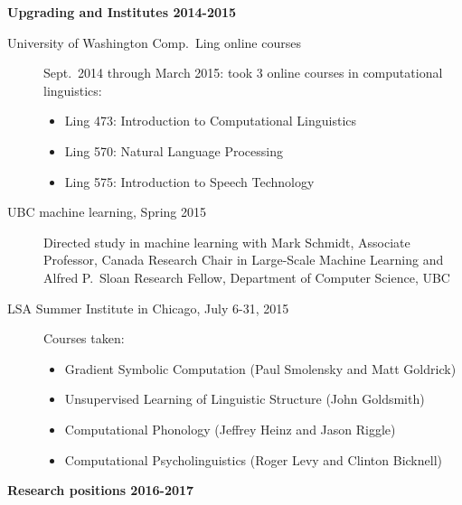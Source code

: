 \documentclass[11pt]{article}
\newcommand{\ii}{\item}
\begin{document}
\medskip


\noindent \textbf{Upgrading and Institutes 2014-2015}

\begin{description}
\ii[University of Washington Comp.\ Ling online courses]
Sept.\ 2014 through March 2015: took 3 online courses in computational linguistics:

\begin{itemize}
\ii[] Ling 473: Introduction to Computational Linguistics
\ii[] Ling 570: Natural Language Processing
\ii[] Ling 575: Introduction to Speech Technology
\end{itemize}

\ii[UBC machine learning, Spring 2015] Directed study in machine learning with Mark Schmidt, Associate Professor, Canada Research Chair in Large-Scale Machine Learning and Alfred P.\ Sloan Research Fellow, Department of Computer Science, UBC

\ii[LSA Summer Institute in Chicago, July 6-31, 2015]  Courses taken:

\begin{itemize}
\ii[] Gradient Symbolic Computation (Paul Smolensky and Matt Goldrick)
 \ii[] Unsupervised Learning of Linguistic Structure (John Goldsmith)
\ii[] Computational Phonology (Jeffrey Heinz and Jason Riggle)
\ii[] Computational Psycholinguistics (Roger Levy and Clinton Bicknell)
\end{itemize}
\end{description}

\noindent \textbf{Research positions 2016-2017}
\end{document}
